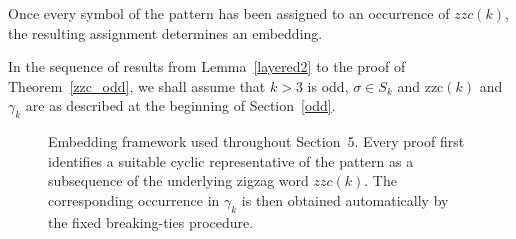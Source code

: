 \documentclass[a4paper,12pt]{article}
\theoremstyle{definition}
\numberwithin{equation}{section}
\begin{document}
Once every symbol of the pattern has been assigned to an occurrence of $zzc(k)$, the resulting assignment determines an embedding.

In the sequence of results from Lemma~\ref{layered2} to the proof of Theorem~\ref{zzc_odd}, we shall assume that $k>3$ is odd, $\sigma\in S_k$ and $\mathrm{zzc}(k)$ and $\gamma_k$ are as described at the beginning of Section~\ref{odd}.


\begin{figure}[h]
\centering
{}
\caption{Embedding framework used throughout Section~5. Every proof first identifies a suitable cyclic representative of the pattern as a subsequence of the underlying zigzag word $zzc(k)$. The corresponding occurrence in $\gamma_k$ is then obtained automatically by the fixed breaking-ties procedure.}
\label{fig:embedding-philosophy}
\end{figure}
\end{document}
